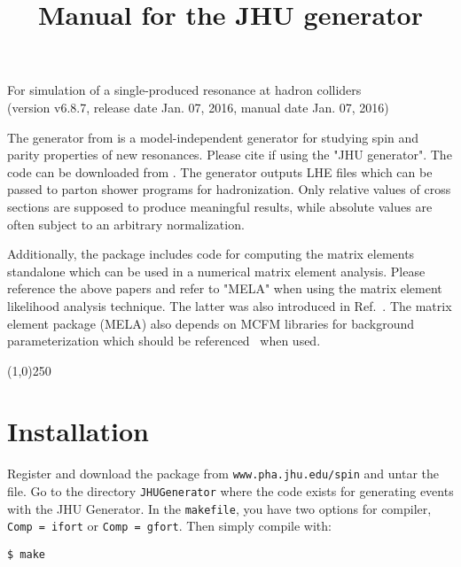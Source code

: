 \documentclass[aps,superscriptaddress,nofootinbib]{revtex4}
\begin{document}
\vspace{0.6cm}

\title{
\large
Manual for the JHU generator
}
\maketitle
\begin{center}
\small
For simulation of a single-produced resonance at hadron colliders \\
(version v6.8.7, release date Jan. 07, 2016, manual date Jan. 07, 2016) \\
\normalsize
\end{center}

\noindent
The generator from \cite{Gao:2010qx,Bolognesi:2012,Anderson:2013} is a model-independent generator for studying spin and parity properties of new resonances.
Please cite \cite{Gao:2010qx,Bolognesi:2012,Anderson:2013} if using the "JHU generator".
The code can be downloaded from \cite{thesite}.
The generator outputs LHE files which can be passed to parton shower programs for hadronization.
Only relative values of cross sections are supposed to produce meaningful results, while absolute values are often subject to an arbitrary normalization.

Additionally, the package includes code for computing the matrix elements standalone which can be used in a numerical matrix element analysis.
Please reference the above papers and refer to "MELA" when using the matrix element likelihood analysis technique.
The latter was also introduced in Ref.~\cite{Chatrchyan:2012ufa}. The matrix element package (MELA) also depends
on MCFM libraries for background parameterization which should be referenced~\cite{Campbell:2010ff} when used.

\vspace{0.5cm}
\begin{center}
\line(1,0){250}
\end{center}
\vspace{0.5cm}
\tableofcontents
\begin{center}
\end{center}
\vspace{0.5cm}


\section{ Installation }

\noindent
Register and download the package from \verb|www.pha.jhu.edu/spin| and untar the file.  Go to the directory \verb|JHUGenerator| where the code exists for generating events with the JHU Generator. In the \verb|makefile|, you have two options for compiler, \verb|Comp = ifort| or \verb|Comp = gfort|.  Then simply compile with:
\begin{verbatim}
$ make
\end{verbatim}
\end{document}
